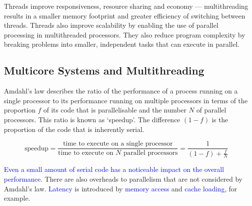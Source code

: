 Threads improve responsiveness, resource sharing and economy --- multithreading results in a smaller memory footprint and greater efficiency of switching between threads.
Threads also improve scalability by enabling the use of parallel processing in multithreaded processors.
They also reduce program complexity by breaking problems into smaller, independent tasks that can execute in parallel.

\subsection{Multicore Systems and Multithreading}

Amdahl's law describes the ratio of the performance of a process running on a single processor to its performance running on multiple processors in terms of the proportion \(f\) of its code that is parallelisable and the number \(N\) of parallel processors.
This ratio is known as `speedup'.
The difference \(\left(1 - f\right)\) is the proportion of the code that is inherently serial.

\begin{equation*}
  \text{speedup} = \frac{\text{time to execute on a single processor}}{\text{time to execute on \(N\) parallel processors}} = \frac{1}{\left(1 - f\right) + \frac{f}{N}}
\end{equation*}

\textcolor{blue}{Even a small amount of serial code has a noticeable impact on the overall performance.}
There are also overheads to parallelism that are not considered by Amdahl's law.
\textcolor{blue}{Latency} is introduced by \textcolor{blue}{memory access} and \textcolor{blue}{cache loading}, for example.

